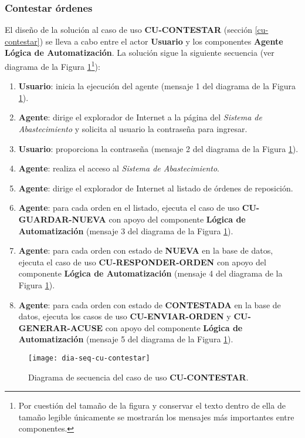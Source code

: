 \subsubsection{Contestar órdenes}
El diseño de la solución al caso de uso \textbf{CU-CONTESTAR} (sección \ref{cu-contestar}) se lleva a cabo entre el actor \textbf{Usuario} y los componentes \textbf{Agente} \textbf{Lógica de Automatización}. La solución sigue la siguiente secuencia (ver diagrama de la Figura \ref{fig:dia-seq-cu-contestar}\footnote{Por cuestión del tamaño de la figura y conservar el texto dentro de ella de tamaño legible únicamente se mostrarán los mensajes más importantes entre componentes.}):
\begin{enumerate}
	\item \textbf{Usuario}: inicia la ejecución del agente (mensaje 1 del diagrama de la Figura \ref{fig:dia-seq-cu-contestar}).
	\item \textbf{Agente}: dirige el explorador de Internet a la página del \textit{Sistema de Abastecimiento} y solicita al usuario la contraseña para ingresar.
	\item \textbf{Usuario}: proporciona la contraseña (mensaje 2 del diagrama de la Figura \ref{fig:dia-seq-cu-contestar}).
	\item \textbf{Agente}: realiza el acceso al \textit{Sistema de Abastecimiento}.
	\item \textbf{Agente}: dirige el explorador de Internet al listado de órdenes de reposición.
	\item \textbf{Agente}: para cada orden en el listado, ejecuta el caso de uso \textbf{CU-GUARDAR-NUEVA} con apoyo del componente \textbf{Lógica de Automatización} (mensaje 3 del diagrama de la Figura \ref{fig:dia-seq-cu-contestar}).
	\item \textbf{Agente}: para cada orden con estado de \textbf{NUEVA} en la base de datos, ejecuta el caso de uso \textbf{CU-RESPONDER-ORDEN} con apoyo del componente \textbf{Lógica de Automatización} (mensaje 4 del diagrama de la Figura \ref{fig:dia-seq-cu-contestar}).
	\item \textbf{Agente}: para cada orden con estado de \textbf{CONTESTADA} en la base de datos, ejecuta los casos de uso \textbf{CU-ENVIAR-ORDEN} y \textbf{CU-GENERAR-ACUSE} con apoyo del componente \textbf{Lógica de Automatización} (mensaje 5 del diagrama de la Figura \ref{fig:dia-seq-cu-contestar}).
\end{enumerate}

\begin{figure}[h]
	\centering
	\texttt{[image: dia-seq-cu-contestar]}
	\caption{Diagrama de secuencia del caso de uso \textbf{CU-CONTESTAR}.}
	\label{fig:dia-seq-cu-contestar}
\end{figure}

